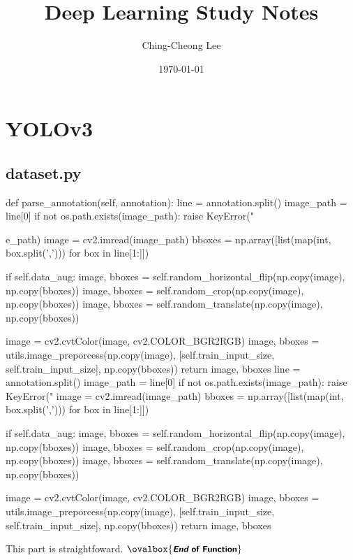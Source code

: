 \documentclass[10pt,a4paper]{article}
\title{Deep Learning Study Notes}
\author{
Ching-Cheong Lee
}
\date{\today}
\newcommand{\END}{\text{}\hfill$\ovalbox{\small\text{\bfseries\sffamily {\itshape End} of Function}}$\bigskip}
\begin{document}
\maketitle
\tableofcontents


\section{YOLOv3}
\subsection{dataset.py}
 
\begin{py}
def parse_annotation(self, annotation):
    line = annotation.split()
    image_path = line[0]
    if not os.path.exists(image_path):
        raise KeyError("%
        
        e_path)
    image = cv2.imread(image_path)
    bboxes = np.array([list(map(int, box.split(','))) for box in line[1:]])

    if self.data_aug:
        image, bboxes = self.random_horizontal_flip(np.copy(image), np.copy(bboxes))
        image, bboxes = self.random_crop(np.copy(image), np.copy(bboxes))
        image, bboxes = self.random_translate(np.copy(image), np.copy(bboxes))

    image = cv2.cvtColor(image, cv2.COLOR_BGR2RGB)
    image, bboxes = utils.image_preporcess(np.copy(image), [self.train_input_size, self.train_input_size], np.copy(bboxes))
    return image, bboxes
    line = annotation.split()
    image_path = line[0]
    if not os.path.exists(image_path):
        raise KeyError("%
    image = cv2.imread(image_path)
    bboxes = np.array([list(map(int, box.split(','))) for box in line[1:]])

    if self.data_aug:
        image, bboxes = self.random_horizontal_flip(np.copy(image), np.copy(bboxes))
        image, bboxes = self.random_crop(np.copy(image), np.copy(bboxes))
        image, bboxes = self.random_translate(np.copy(image), np.copy(bboxes))

    image = cv2.cvtColor(image, cv2.COLOR_BGR2RGB)
    image, bboxes = utils.image_preporcess(np.copy(image), [self.train_input_size, self.train_input_size], np.copy(bboxes))
    return image, bboxes
\end{py}
This part is straightfoward. \END
\end{document}
